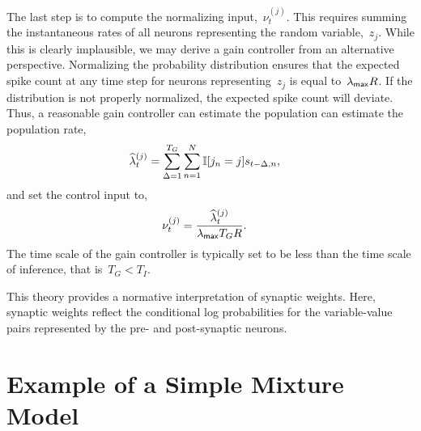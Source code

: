 The last step is to compute the normalizing input,~$\nu_t^{(j)}$.
This requires summing the instantaneous rates of all neurons representing the
random variable,~$z_j$. While this is clearly implausible, we may derive
a gain controller from an alternative perspective. Normalizing the
probability distribution ensures that the expected spike count at
any time step for
neurons representing~$z_j$ is equal to~$\lambda_{\mathsf{max}} R$. If the distribution
is not properly normalized, the expected spike count will deviate.
Thus, a reasonable gain controller can estimate the population
can estimate the population rate,
\begin{align}
\widehat{\lambda}_{t}^{(j)} &= \sum_{\Delta = 1}^{T_G} \sum_{n=1}^N \mathbb{I}[j_n=j] s_{t-\Delta, n},
\end{align}
and set the control input to,
\begin{align}
  \nu_{t}^{(j)} &= \frac{\widehat{\lambda}_{t}^{(j)}}{\lambda_{\mathsf{max}} T_G R}.
\end{align}
The time scale of the gain controller is typically set to be
less than the time scale of inference, that is~$T_G < T_I$.


This theory provides a normative interpretation of synaptic weights.
Here, synaptic weights reflect the conditional log probabilities
for the variable-value pairs represented by the pre- and post-synaptic
neurons.

\section{Example of a Simple Mixture Model}
\label{sec:mixture_example}

